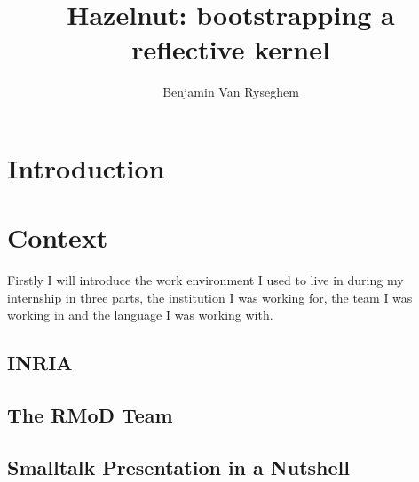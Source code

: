 \documentclass{book}
\begin{document}
\makeatother

\title{Hazelnut: bootstrapping a reflective kernel}
\author{Benjamin Van Ryseghem}



\newpage






\newpage


\tableofcontents

\newpage



\chapter{Introduction}

	

\chapter{Context}

Firstly I will introduce the work environment I used to live in during my internship in three parts, the institution I was working for, the team I was working in and the language I was working with.

	\section{INRIA}
	\section{The RMoD Team}
	\section{Smalltalk Presentation in a Nutshell}
\end{document}
